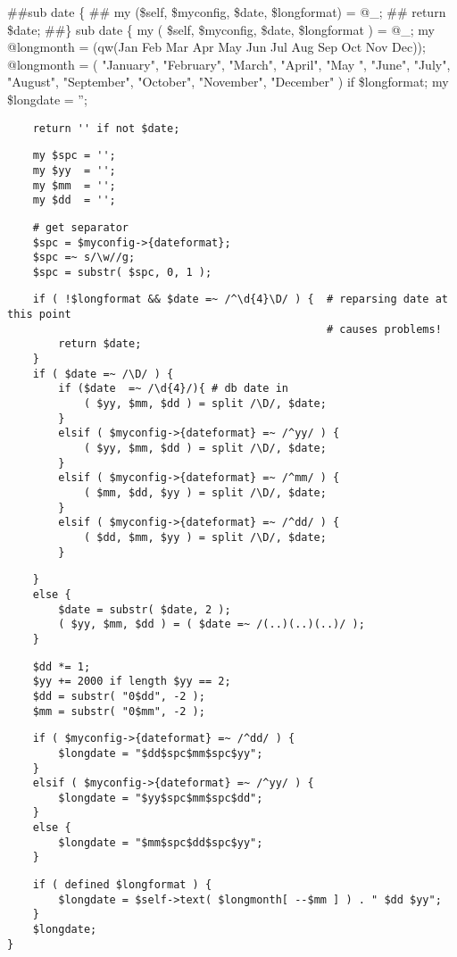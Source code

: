 \begin{description}
\begin{description}
\begin{description}
\begin{description}
\begin{description}
\#\#sub date \{
\#\#	my (\$self, \$myconfig, \$date, \$longformat) = @\_;
\#\#	return \$date;
\#\#\}
sub date \{
    my ( \$self, \$myconfig, \$date, \$longformat ) = @\_;
    my @longmonth = (qw(Jan Feb Mar Apr May Jun Jul Aug Sep Oct Nov Dec));
    @longmonth = (
        "January",   "February", "March",    "April",
        "May ",      "June",     "July",     "August",
        "September", "October",  "November", "December"
    ) if \$longformat;
    my \$longdate = '';

\begin{verbatim}
    return '' if not $date;
\end{verbatim}
\begin{verbatim}
    my $spc = '';
    my $yy  = '';
    my $mm  = '';
    my $dd  = '';
\end{verbatim}
\begin{verbatim}
    # get separator
    $spc = $myconfig->{dateformat};
    $spc =~ s/\w//g;
    $spc = substr( $spc, 0, 1 );
\end{verbatim}
\begin{verbatim}
    if ( !$longformat && $date =~ /^\d{4}\D/ ) {  # reparsing date at this point
                                                  # causes problems!
        return $date;
    }
    if ( $date =~ /\D/ ) {
        if ($date  =~ /\d{4}/){ # db date in
            ( $yy, $mm, $dd ) = split /\D/, $date;
        }
        elsif ( $myconfig->{dateformat} =~ /^yy/ ) {
            ( $yy, $mm, $dd ) = split /\D/, $date;
        }
        elsif ( $myconfig->{dateformat} =~ /^mm/ ) {
            ( $mm, $dd, $yy ) = split /\D/, $date;
        }
        elsif ( $myconfig->{dateformat} =~ /^dd/ ) {
            ( $dd, $mm, $yy ) = split /\D/, $date;
        }
\end{verbatim}
\begin{verbatim}
    }
    else {
        $date = substr( $date, 2 );
        ( $yy, $mm, $dd ) = ( $date =~ /(..)(..)(..)/ );
    }
\end{verbatim}
\begin{verbatim}
    $dd *= 1;
    $yy += 2000 if length $yy == 2;
    $dd = substr( "0$dd", -2 );
    $mm = substr( "0$mm", -2 );
\end{verbatim}
\begin{verbatim}
    if ( $myconfig->{dateformat} =~ /^dd/ ) {
        $longdate = "$dd$spc$mm$spc$yy";
    }
    elsif ( $myconfig->{dateformat} =~ /^yy/ ) {
        $longdate = "$yy$spc$mm$spc$dd";
    }
    else {
        $longdate = "$mm$spc$dd$spc$yy";
    }
\end{verbatim}
\begin{verbatim}
    if ( defined $longformat ) {
        $longdate = $self->text( $longmonth[ --$mm ] ) . " $dd $yy";
    }
    $longdate;
}
\end{verbatim}



\end{description}
\end{description}
\end{description}
\end{description}
\end{description}
